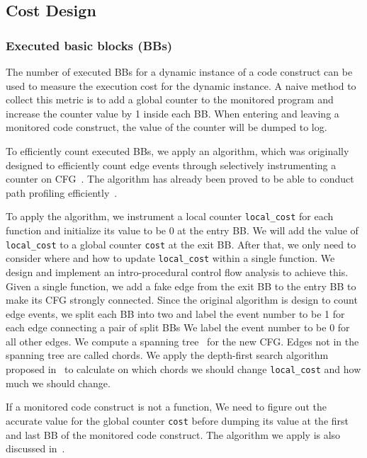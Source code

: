 \subsection{Cost Design}

\subsubsection{Executed basic blocks (BBs)}
The number of executed BBs for a dynamic instance of a code construct
can be used to measure the execution cost for the dynamic instance. 
A naive method to collect this metric is to add a global counter 
to the monitored program and increase the counter value by 1 inside each BB.  
When entering and leaving a monitored code construct, 
the value of the counter will be dumped to log.

To efficiently count executed BBs, 
we apply an algorithm, which was originally designed to 
efficiently count edge events through selectively instrumenting a counter 
on CFG~\cite{event-counting}.
The algorithm has already been proved to be able to 
conduct path profiling efficiently~\cite{peter-ase,path-profiling}. 

To apply the algorithm,
we instrument a local counter \texttt{local\_cost} for each function
and initialize its value to be 0 at the entry BB. 
We will add the value of \texttt{local\_cost} to a global counter \texttt{cost} 
at the exit BB.
After that, we only need to consider where 
and how to update \texttt{local\_cost} 
within a single function.
We design and implement an intro-procedural control flow analysis
to achieve this.
Given a single function,
we add a fake edge from the exit BB to the entry BB 
to make its CFG strongly connected. 
Since the original algorithm is design to count edge events,
we split each BB into two 
and label the event number to be 1 for each edge connecting a pair of split BBs 
We label the event number to be 0 for all other edges.
We compute a spanning tree~\cite{spanning} for the new CFG.
Edges not in the spanning tree are called chords.
We apply the depth-first search algorithm proposed in~\cite{event-counting} 
to calculate on which chords we should change 
\texttt{local\_cost} 
and how much we should change.

If a monitored code construct is not a function,
We need to figure out the accurate value for the global counter \texttt{cost} 
before dumping its value 
at the first and last BB of the monitored code construct.
The algorithm we apply is also discussed in~\cite{event-counting}.





